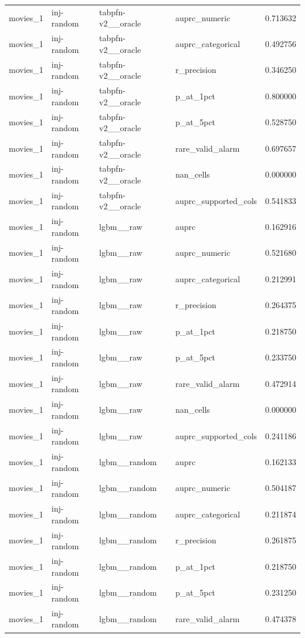 \begin{tabular}{lllll}
movies\_1 & inj-random & tabpfn-v2\_\_oracle & auprc\_numeric & 0.713632 \\
movies\_1 & inj-random & tabpfn-v2\_\_oracle & auprc\_categorical & 0.492756 \\
movies\_1 & inj-random & tabpfn-v2\_\_oracle & r\_precision & 0.346250 \\
movies\_1 & inj-random & tabpfn-v2\_\_oracle & p\_at\_1pct & 0.800000 \\
movies\_1 & inj-random & tabpfn-v2\_\_oracle & p\_at\_5pct & 0.528750 \\
movies\_1 & inj-random & tabpfn-v2\_\_oracle & rare\_valid\_alarm & 0.697657 \\
movies\_1 & inj-random & tabpfn-v2\_\_oracle & nan\_cells & 0.000000 \\
movies\_1 & inj-random & tabpfn-v2\_\_oracle & auprc\_supported\_cols & 0.541833 \\
movies\_1 & inj-random & lgbm\_\_raw & auprc & 0.162916 \\
movies\_1 & inj-random & lgbm\_\_raw & auprc\_numeric & 0.521680 \\
movies\_1 & inj-random & lgbm\_\_raw & auprc\_categorical & 0.212991 \\
movies\_1 & inj-random & lgbm\_\_raw & r\_precision & 0.264375 \\
movies\_1 & inj-random & lgbm\_\_raw & p\_at\_1pct & 0.218750 \\
movies\_1 & inj-random & lgbm\_\_raw & p\_at\_5pct & 0.233750 \\
movies\_1 & inj-random & lgbm\_\_raw & rare\_valid\_alarm & 0.472914 \\
movies\_1 & inj-random & lgbm\_\_raw & nan\_cells & 0.000000 \\
movies\_1 & inj-random & lgbm\_\_raw & auprc\_supported\_cols & 0.241186 \\
movies\_1 & inj-random & lgbm\_\_random & auprc & 0.162133 \\
movies\_1 & inj-random & lgbm\_\_random & auprc\_numeric & 0.504187 \\
movies\_1 & inj-random & lgbm\_\_random & auprc\_categorical & 0.211874 \\
movies\_1 & inj-random & lgbm\_\_random & r\_precision & 0.261875 \\
movies\_1 & inj-random & lgbm\_\_random & p\_at\_1pct & 0.218750 \\
movies\_1 & inj-random & lgbm\_\_random & p\_at\_5pct & 0.231250 \\
movies\_1 & inj-random & lgbm\_\_random & rare\_valid\_alarm & 0.474378 \\

\end{tabular}
